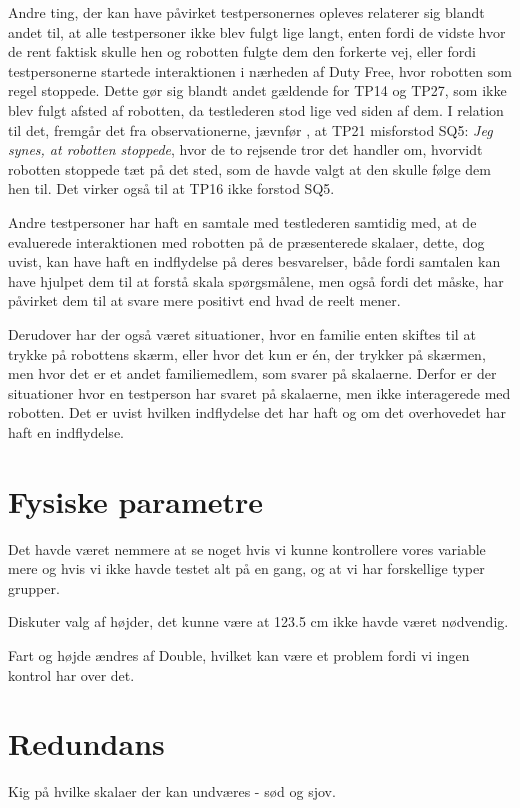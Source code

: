 Andre ting, der kan have påvirket testpersonernes opleves relaterer sig blandt andet til, at alle testpersoner ikke blev fulgt lige langt, enten fordi de vidste hvor de rent faktisk skulle hen og robotten fulgte dem den forkerte vej, eller fordi testpersonerne startede interaktionen i nærheden af Duty Free, hvor robotten som regel stoppede. Dette gør sig blandt andet gældende for TP14 og TP27, som ikke blev fulgt afsted af robotten, da testlederen stod lige ved siden af dem. I relation til det, fremgår det fra observationerne, jævnfør , at TP21 misforstod SQ5: \textit{Jeg synes, at robotten stoppede}, hvor de to rejsende tror det handler om, hvorvidt robotten stoppede tæt på det sted, som de havde valgt at den skulle følge dem hen til. Det virker også til at TP16 ikke forstod SQ5. 

Andre testpersoner har haft en samtale med testlederen samtidig med, at de evaluerede interaktionen med robotten på de præsenterede skalaer, dette, dog uvist, kan have haft en indflydelse på deres besvarelser, både fordi samtalen kan have hjulpet dem til at forstå skala spørgsmålene, men også fordi det måske, har påvirket dem til at svare mere positivt end hvad de reelt mener.

Derudover har der også været situationer, hvor en familie enten skiftes til at trykke på robottens skærm, eller hvor det kun er én, der trykker på skærmen, men hvor det er et andet familiemedlem, som svarer på skalaerne. Derfor er der situationer hvor en testperson har svaret på skalaerne, men ikke interagerede med robotten. Det er uvist hvilken indflydelse det har haft og om det overhovedet har haft en indflydelse.  


\section{Fysiske parametre}
\label{DiskussionFysiskeParametre}
%




Det havde været nemmere at se noget hvis vi kunne kontrollere vores variable mere og hvis vi ikke havde testet alt på en gang, og at vi har forskellige typer grupper. 

Diskuter valg af højder, det kunne være at 123.5 cm ikke havde været nødvendig. 


Fart og højde ændres af Double, hvilket kan være et problem fordi vi ingen kontrol har over det. 



\section{Redundans}
\label{DiskussionRedundansSkalaer}
%
Kig på hvilke skalaer der kan undværes - sød og sjov. 




 




 









